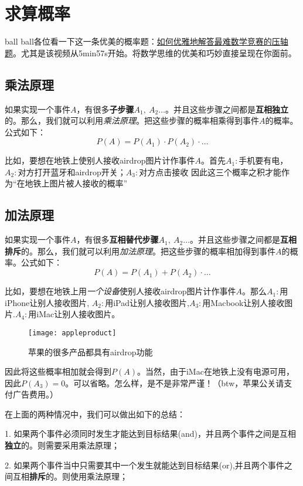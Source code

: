 \section{求算概率}
ball ball各位看一下这一条优美的概率题：\href{https://www.bilibili.com/video/BV17W411a74F?share_source=copy_web}{如何优雅地解答最难数学竞赛的压轴题}。尤其是该视频从5min57s开始。将数学思维的优美和巧妙直接呈现在你面前。

\subsection*{乘法原理}
如果实现一个事件$A$，有很多\textbf{子步骤}$A_1,\ A_2 \ldots$。并且这些步骤之间都是\textbf{互相独立}的。那么，我们就可以利用\emph{乘法原理}。把这些步骤的概率相乘得到事件$A$的概率。公式如下：
\[
	P(A)=P(A_1)\cdot P(A_2) \cdot \ldots 	
\]

比如，要想在地铁上使别人接收airdrop图片计作事件$A$。首先$A_1:$手机要有电， $A_2:$对方打开蓝牙和airdrop开关；$A_3:$对方点击接收
因此这三个概率之积才能作为``在地铁上图片被人接收的概率''

\subsection*{加法原理}
如果实现一个事件$A$，有很多\textbf{互相替代步骤}$A_1,\ A_2 \ldots$。并且这些步骤之间都是\textbf{互相排斥}的。那么，我们就可以利用\emph{加法原理}。把这些步骤的概率相加得到事件$A$的概率。公式如下：
\[
	P(A)=P(A_1) + P(A_2) \cdot \ldots 	
\]

比如，要想在地铁上用\emph{一个设备}使别人接收airdrop图片计作事件$A$。那么$A_1:$用iPhone让别人接收图片, $A_2:$用iPad让别人接收图片,$A_3:$用Macbook让别人接收图片.$A_4:$用iMac让别人接收图片。
\begin{figure}[H]
\centering
\texttt{[image: appleproduct]}
\caption{苹果的很多产品都具有airdrop功能}
\end{figure}


因此将这些概率相加就会得到$P(A)$。当然，由于iMac在地铁上没有电源可用，因此$P(A_3)=0$。可以省略。怎么样，是不是非常严谨！（btw，苹果公关请支付广告费用。）

在上面的两种情况中，我们可以做出如下的总结：
\begin{SummBox}
1. 如果两个事件必须同时发生才能达到目标结果(and)，并且两个事件之间是互相\textbf{独立}的。则需要采用乘法原理；

2. 如果两个事件当中只需要其中一个发生就能达到目标结果(or),并且两个事件之间互相\textbf{排斥}的。则使用乘法原理；
\end{SummBox}


